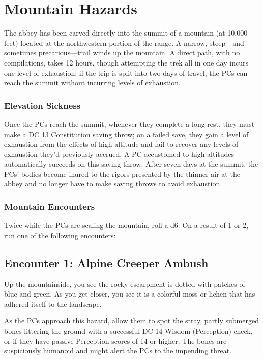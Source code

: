 \documentclass[10pt,a4paper,twoside,bg=print,twocolumn,openany,nodeprecatedcode]{dndbook}
\begin{document}
\section{Mountain Hazards}
The abbey has been carved directly into the summit of a mountain (at 10,000 feet) located at the northwestern portion of the range. A narrow, steep—and sometimes precarious—trail winds up the mountain. A direct path, with no compilations, takes 12 hours, though attempting the trek all in one day incurs one level of exhaustion; if the trip is split into two days of travel, the PCs can reach the summit without incurring levels of exhaustion.

\subsubsection{Elevation Sickness}
Once the PCs reach the summit, whenever they complete a long rest, they must make a DC 13 Constitution saving throw; on a failed save, they gain a level of exhaustion from the effects of high altitude and fail to recover any levels of exhaustion they'd previously accrued. A PC accustomed to high altitudes automatically succeeds on this saving throw. After seven days at the summit, the PCs' bodies become inured to the rigors presented by the thinner air at the abbey and no longer have to make saving throws to avoid exhaustion.

\subsubsection{Mountain Encounters}
Twice while the PCs are scaling the mountain, roll a d6. On a result of 1 or 2, run one of the following encounters:

\subsection{Encounter 1: Alpine Creeper Ambush}
\begin{DndReadAloud}{}
Up the mountainside, you see the rocky escarpment is dotted with patches of blue and green. As you get closer, you see it is a colorful moss or lichen that has adhered itself to the landscape.

\end{DndReadAloud}

As the PCs approach this hazard, allow them to spot the stray, partly submerged bones littering the ground with a successful DC 14 Wisdom (Perception) check, or if they have passive Perception scores of 14 or higher. The bones are suspiciously humanoid and might alert the PCs to the impending threat.
\end{document}
